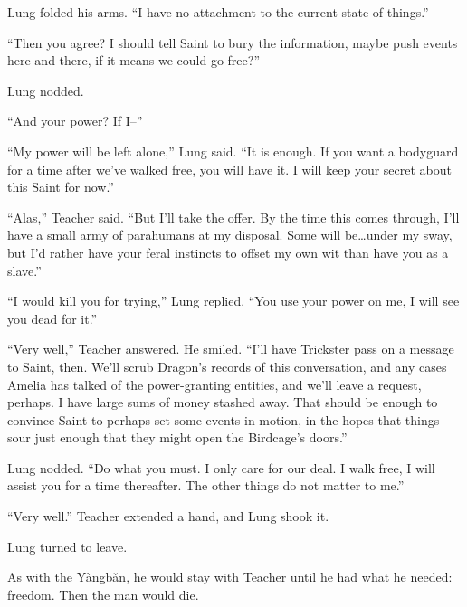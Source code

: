 Lung folded his arms.  ``I have no attachment to the current state of things.''



``Then you agree?  I should tell Saint to bury the information, maybe push events here and there, if it means we could go free?''



Lung nodded.



``And your power?  If I--''



``My power will be left alone,'' Lung said.  ``It is enough.  If you want a bodyguard for a time after we've walked free, you will have it.  I will keep your secret about this Saint for now.''



``Alas,'' Teacher said.  ``But I'll take the offer.  By the time this comes through, I'll have a small army of parahumans at my disposal.  Some will be\ldots under my sway, but I'd rather have your feral instincts to offset my own wit than have you as a slave.''



``I would kill you for trying,'' Lung replied.  ``You use your power on me, I will see you dead for it.''



``Very well,'' Teacher answered.  He smiled.  ``I'll have Trickster pass on a message to Saint, then.  We'll scrub Dragon's records of this conversation, and any cases Amelia has talked of the power-granting entities, and we'll leave a request, perhaps.  I have large sums of money stashed away.  That should be enough to convince Saint to perhaps set some events in motion, in the hopes that things sour just enough that they might open the Birdcage's doors.''



Lung nodded.  ``Do what you must.  I only care for our deal.  I walk free, I will assist you for a time thereafter.  The other things do not matter to me.''



``Very well.''  Teacher extended a hand, and Lung shook it.



Lung turned to leave.



As with the Y\`{a}ngb\v{a}n, he would stay with Teacher until he had what he needed: freedom.  Then the man would die.



